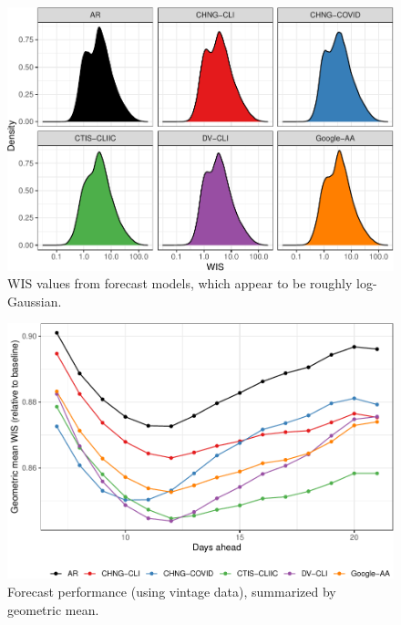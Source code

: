 \documentclass[9pt,twoside,lineno]{pnas-new}
\begin{document}
\clearpage

\begin{figure}

{\centering \includegraphics[width=\textwidth]{fig/wis-densities-1} 

}

\caption{WIS values from forecast models, which appear to be roughly log-Gaussian.}\label{fig:wis-densities}
\end{figure}

\clearpage

\begin{figure}

{\centering \includegraphics[width=\textwidth]{fig/fcast-adjusted-1} 

}

\caption{Forecast performance (using vintage data), summarized by geometric mean.}\label{fig:fcast-adjusted}
\end{figure}
\end{document}
